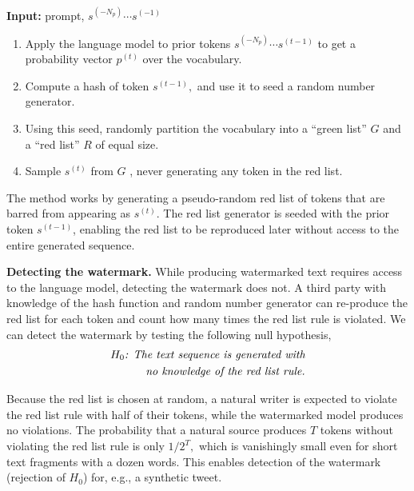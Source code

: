 \documentclass{article}
\theoremstyle{plain}
\theoremstyle{definition}
\theoremstyle{remark}
\begin{document}
\begin{algorithm}[h]
   \caption{Text Generation with Hard Red List}
   \label{hard}
\begin{algorithmic}
\STATE \textbf{Input:} prompt, $s^{(-N_p)}\cdots s^{(-1)}$
 \STATE 
 \begin{enumerate}
\item Apply the language model to prior tokens $s^{(-N_p)}\cdots s^{(t-1)}$ to get a probability vector $p^{(t)}$ over the vocabulary.
\item Compute a hash of token $s^{(t-1)},$ and use it to seed a random number generator.
\item Using this seed, randomly partition the vocabulary into a ``green list'' $G$ and a ``red list'' $R$ of equal size. 
\item Sample $s^{(t)}$ from $G$ , never generating any token in the red list.
\end{enumerate}
\ENDFOR
\end{algorithmic}
\end{algorithm}
The method works by generating a pseudo-random red list of tokens that are barred from appearing as $s^{(t)}.$   The red list generator is seeded with the prior token $s^{(t-1)}$, enabling the red list to be reproduced later without access to the entire generated sequence.

\textbf{Detecting the watermark.}
While producing watermarked text requires access to the language model, detecting the watermark does not. A third party with knowledge of the hash function and random number generator can re-produce the red list for each token and count how many times the red list rule is violated.
%
We can detect the watermark by testing the following null hypothesis, 
\begin{align} \label{null}
\begin{split}
\text{\em $H_0$: The text sequence is generated with} \\ \text{\em no knowledge of the red list rule.} 
\end{split}
\end{align}

Because the red list is chosen at random, a natural writer is expected to violate the red list rule with half of their tokens, while the watermarked model produces no violations. The probability that a natural source produces $T$ tokens without violating the red list rule is only $1/2^T,$ which is vanishingly small even for short text fragments with a dozen words.  This enables detection of the watermark (rejection of $H_0$) for, e.g., a synthetic tweet.   
\end{document}
